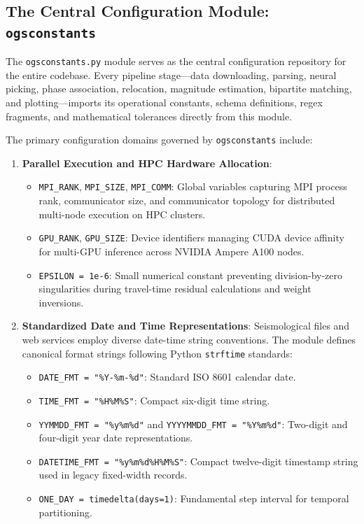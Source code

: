 \subsection{The Central Configuration Module: \texttt{ogsconstants}}
\label{sec:ogsconstants}

The \texttt{ogsconstants.py} module serves as the central configuration
repository for the entire codebase. Every pipeline stage—data downloading,
parsing, neural picking, phase association, relocation, magnitude estimation,
bipartite matching, and plotting—imports its operational constants, schema
definitions, regex fragments, and mathematical tolerances directly from this
module.

The primary configuration domains governed by \texttt{ogsconstants} include:
\begin{enumerate}
  \item \textbf{Parallel Execution and \ac{HPC} Hardware Allocation}:
    \begin{itemize}
      \item \texttt{MPI\_RANK}, \texttt{MPI\_SIZE},
        \texttt{MPI\_COMM}: Global variables capturing \acf{MPI} process rank,
        communicator size, and communicator topology for distributed multi-node
        execution on \ac{HPC} clusters.
      \item \texttt{GPU\_RANK}, \texttt{GPU\_SIZE}: Device identifiers managing
        \ac{CUDA} device affinity for multi-\ac{GPU} inference
        across NVIDIA Ampere A100 nodes.
      \item \texttt{EPSILON = 1e-6}: Small numerical constant preventing
        division-by-zero singularities during travel-time residual calculations
        and weight inversions.
    \end{itemize}

  \item \textbf{Standardized Date and Time Representations}:
    Seismological files and web services employ diverse date-time string
    conventions. The module defines canonical format strings following Python
    \texttt{strftime} standards:
    \begin{itemize}
      \item \texttt{DATE\_FMT = "\%Y-\%m-\%d"}: Standard ISO 8601 calendar
        date.
      \item \texttt{TIME\_FMT = "\%H\%M\%S"}: Compact six-digit time string.
      \item \texttt{YYMMDD\_FMT = "\%y\%m\%d"} and
        \texttt{YYYYMMDD\_FMT = "\%Y\%m\%d"}: Two-digit and four-digit year
        date representations.
      \item \texttt{DATETIME\_FMT = "\%y\%m\%d\%H\%M\%S"}: Compact
        twelve-digit timestamp string used in legacy fixed-width records.
      \item \texttt{ONE\_DAY = timedelta(days=1)}: Fundamental step interval
        for temporal partitioning.
    \end{itemize}


\end{enumerate}
